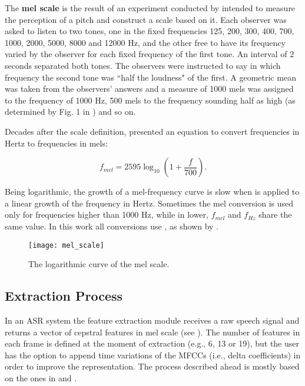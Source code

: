 The \textbf{mel scale} is the result of an experiment conducted by  intended to measure the perception of a pitch and construct a scale based on it. Each observer was asked to listen to two tones, one in the fixed frequencies 125, 200, 300, 400, 700, 1000, 2000, 5000, 8000 and 12000 Hz, and the other free to have its frequency varied by the observer for each fixed frequency of the first tone. An interval of 2 seconds separated both tones. The observers were instructed to say in which frequency the second tone was ``half the loudness" of the first. A geometric mean was taken from the observers' answers and a measure of 1000 mels was assigned to the frequency of 1000 Hz, 500 mels to the frequency sounding half as high (as determined by Fig. 1 in ) and so on.

Decades after the scale definition,  presented an equation to convert frequencies in Hertz to frequencies in mels:

\begin{equation}
    f_{mel} = 2595 \log_{10}(1 + \frac{f}{700}).
    \label{eq:mel_conversion}
\end{equation}

\noindent Being logarithmic, the growth of a mel-frequency curve is slow when  is applied to a linear growth of the frequency in Hertz. Sometimes the mel conversion is used only for frequencies higher than 1000 Hz, while in lower, $f_{mel}$ and $f_{Hz}$ share the same value. In this work all conversions use , as shown by .

\begin{figure}[ht]
    \centering
    \texttt{[image: mel\_scale]}
    \caption{The logarithmic curve of the mel scale.}
    \label{fig:mel_scale}
\end{figure}

\subsection{Extraction Process}

In an ASR system the feature extraction module receives a raw speech signal and returns a vector of cepstral features in mel scale (see ). The number of features in each frame is defined at the moment of extraction (e.g., 6, 13 or 19), but the user has the option to append time variations of the MFCCs (i.e., delta coefficients) in order to improve the representation. The process described ahead is mostly based on the ones in  and .

